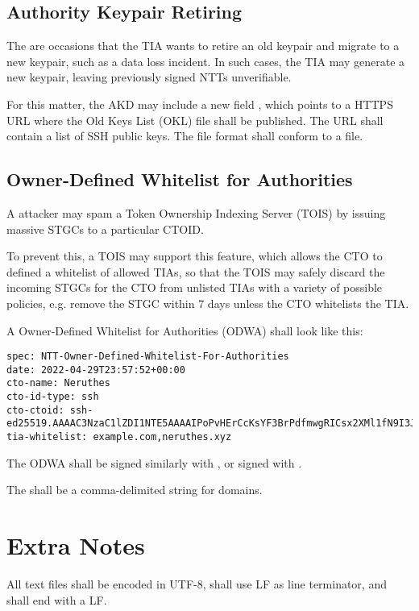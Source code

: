 \subsection{Authority Keypair Retiring}

The are occasions that the TIA wants to retire an old keypair and migrate to a new keypair, such as a data loss incident.
In such cases, the TIA may generate a new keypair, leaving previously signed NTTs unverifiable.

For this matter, the AKD may include a new field ,
which points to a HTTPS URL where the Old Keys List (OKL) file shall be published.
The URL shall contain a list of SSH public keys.
The file format shall conform to a  file.


\subsection{Owner-Defined Whitelist for Authorities}

A attacker may spam a Token Ownership Indexing Server (TOIS) by issuing massive STGCs to a particular CTOID.

To prevent this, a TOIS may support this feature, which allows the CTO to defined a whitelist of allowed TIAs,
so that the TOIS may safely discard the incoming STGCs for the CTO from unlisted TIAs with a variety of possible policies,
e.g. remove the STGC within 7 days unless the CTO whitelists the TIA.

A Owner-Defined Whitelist for Authorities (ODWA) shall look like this:

\begin{lstlisting}
spec: NTT-Owner-Defined-Whitelist-For-Authorities
date: 2022-04-29T23:57:52+00:00
cto-name: Neruthes
cto-id-type: ssh
cto-ctoid: ssh-ed25519.AAAAC3NzaC1lZDI1NTE5AAAAIPoPvHErCcKsYF3BrPdfmwgRICsx2XMl1fN9I3Jg1pPA
tia-whitelist: example.com,neruthes.xyz
\end{lstlisting}

The ODWA shall be signed similarly with , or signed with .

The  shall be a comma-delimited string for domains.










\section{Extra Notes}

\begin{compactitem}
	\item All text files shall be encoded in UTF-8, shall use LF as line terminator, and shall end with a LF.
\end{compactitem}
















